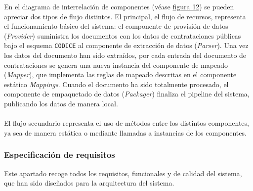             En el diagrama de interrelación de componentes (véase \hyperref[fig:componentes]{figura 12}) se pueden apreciar dos tipos de flujo distintos.
\newpage
            El principal, el flujo de recursos, representa el funcionamiento básico del sistema: el componente de provisión de datos (\textit{Provider}) suministra los documentos con los datos de contrataciones públicas bajo el esquema \texttt{CODICE} al componente de extracción de datos (\textit{Parser}). Una vez los datos del documento han sido extraídos, por cada entrada del documento de contrataciones se genera una nueva instancia del componente de mapeado (\textit{Mapper}), que implementa las reglas de mapeado descritas en el componente estático \textit{Mappings}. Cuando el documento ha sido totalmente procesado, el componente de empaquetado de datos (\textit{Packager}) finaliza el pipeline del sistema, publicando los datos de manera local.
            \\ \\
            El flujo secundario representa el uso de métodos entre los distintos componentes, ya sea de manera estática o mediante llamadas a instancias de los componentes.
            
        \subsubsection{Especificación de requisitos}
            Este apartado recoge todos los requisitos, funcionales y de calidad del sistema, que han sido diseñados para la arquitectura del sistema.

